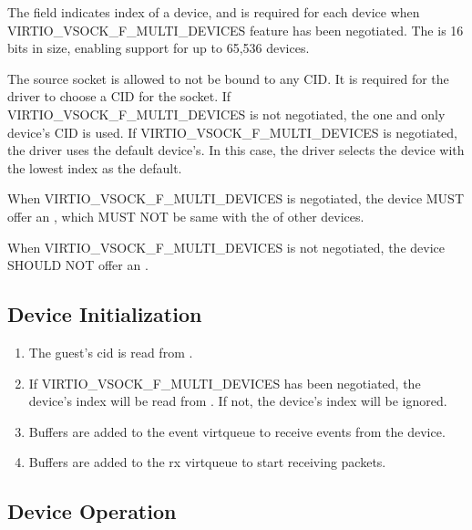 The  field indicates index of a device, and is required for
each device when VIRTIO_VSOCK_F_MULTI_DEVICES feature has been negotiated.
The  is 16 bits in size, enabling support for up to 65,536
devices.

The source socket is allowed to not be bound to any CID. It is required for
the driver to choose a CID for the socket. If VIRTIO_VSOCK_F_MULTI_DEVICES
is not negotiated, the one and only device's CID is used. If
VIRTIO_VSOCK_F_MULTI_DEVICES is negotiated, the driver uses the default
device's. In this case, the driver selects the device with the lowest index
as the default.


When VIRTIO_VSOCK_F_MULTI_DEVICES is negotiated, the device MUST offer an
, which MUST NOT be same with the  of other
devices.

When VIRTIO_VSOCK_F_MULTI_DEVICES is not negotiated, the device SHOULD NOT
offer an .

\subsection{Device Initialization}\label{sec:Device Types / Socket Device / Device Initialization}

\begin{enumerate}
\item The guest's cid is read from .

\item If VIRTIO_VSOCK_F_MULTI_DEVICES has been negotiated, the device's
index will be read from . If not, the device's index will
be ignored.

\item Buffers are added to the event virtqueue to receive events from the device.

\item Buffers are added to the rx virtqueue to start receiving packets.
\end{enumerate}

\subsection{Device Operation}\label{sec:Device Types / Socket Device / Device Operation}


